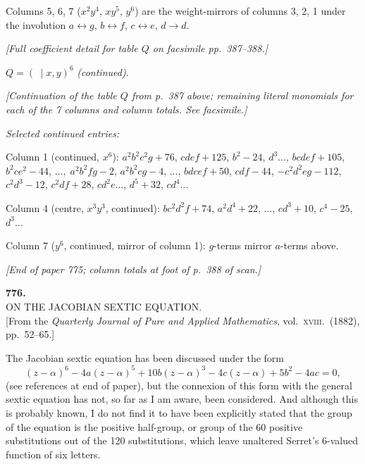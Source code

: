 \documentclass[11pt]{article}
\begin{document}
\noindent
Columns 5, 6, 7 ($x^{2}y^{4}$, $xy^{5}$, $y^{6}$) are the
weight-mirrors of columns 3, 2, 1 under the involution
$a\leftrightarrow g$, $b\leftrightarrow f$, $c\leftrightarrow e$,
$d\to d$.

\medskip
\noindent
\textit{[Full coefficient detail for table $Q$ on facsimile pp.~387--388.]}

\newpage
\noindent
$Q=(\;\mid x,y)^{6}$ \textit{(continued)}.

\medskip
\noindent
\textit{[Continuation of the table $Q$ from p.~387 above; remaining
literal monomials for each of the 7 columns and column totals.  See
facsimile.]}

\medskip
\noindent
\textit{Selected continued entries:}
\smallskip

\noindent
Column 1 (continued, $x^{6}$):
$a^{2}b^{2}c^{2}g+76$, $cdef+125$, $b^{2}-24$,
$d^{3}\ldots$, $bcdef+105$, $b^{2}ce^{2}-44$,
$\ldots,\;a^{2}b^{2}fg-2$, $a^{2}b^{2}cg-4$, $\ldots$,
$bdcef+50$, $cdf-44$, $-c^{2}d^{2}eg-112$, $c^{2}d^{3}-12$,
$c^{2}df+28$, $cd^{2}e\ldots$, $d^{5}+32$, $cd^{4}\ldots$
\smallskip

\noindent
Column 4 (centre, $x^{3}y^{3}$, continued):
$bc^{2}d^{2}f+74$, $a^{2}d^{4}+22$, $\ldots$,
$cd^{3}+10$, $c^{4}-25$, $d^{3}\ldots$
\smallskip

\noindent
Column 7 ($y^{6}$, continued, mirror of column 1):
$g$-terms mirror $a$-terms above.

\medskip
\noindent
\textit{[End of paper 775; column totals at foot of p.~388 of
scan.]}

\newpage

\begin{center}
\textbf{776.}\\[4pt]
\textsc{ON THE JACOBIAN SEXTIC EQUATION.}\\[4pt]
[From the \textit{Quarterly Journal of Pure and Applied
Mathematics}, vol.\ \textsc{xviii}.\ (1882), pp.\ 52--65.]
\end{center}

\bigskip

\noindent
The Jacobian sextic equation has been discussed under the form
\[
  (z-\alpha)^{6}-4a(z-\alpha)^{5}+10b(z-\alpha)^{3}-4c(z-\alpha)+5b^{2}-4ac=0,
\]
(see references at end of paper), but the connexion of this form
with the general sextic equation has not, so far as I am aware,
been considered.  And although this is probably known, I do not find
it to have been explicitly stated that the group of the equation is
the positive half-group, or group of the 60 positive substitutions
out of the 120 substitutions, which leave unaltered Serret's
6-valued function of six letters.
\end{document}
